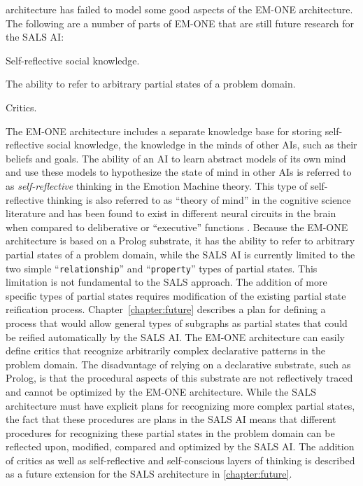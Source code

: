 architecture has failed to model some good aspects of the EM-ONE
architecture.  The following are a number of parts of EM-ONE that are
still future research for the SALS AI:
\begin{packed_enumerate}
\item{Self-reflective social knowledge.}
\item{The ability to refer to arbitrary partial states of a problem
  domain.}
\item{Critics.}
\end{packed_enumerate}
The EM-ONE architecture includes a separate knowledge base for storing
self-reflective social knowledge, the knowledge in the minds of other
AIs, such as their beliefs and goals.  The ability of an AI to learn
abstract models of its own mind and use these models to hypothesize
the state of mind in other AIs is referred to as
{\emph{self-reflective}} thinking in the Emotion Machine theory.  This
type of self-reflective thinking is also referred to as ``theory of
mind'' in the cognitive science literature and has been found to exist
in different neural circuits in the brain when compared to
deliberative or ``executive'' functions \cite[]{saxe:2006}.  Because
the EM-ONE architecture is based on a Prolog substrate, it has the
ability to refer to arbitrary partial states of a problem domain,
while the SALS AI is currently limited to the two simple
``{\tt{relationship}}'' and ``{\tt{property}}'' types of partial
states.  This limitation is not fundamental to the SALS approach.  The
addition of more specific types of partial states requires
modification of the existing partial state reification process.
{\mbox{Chapter~\ref{chapter:future}}} describes a plan for defining a
process that would allow general types of subgraphs as partial states
that could be reified automatically by the SALS AI.  The EM-ONE
architecture can easily define critics that recognize arbitrarily
complex declarative patterns in the problem domain.  The disadvantage
of relying on a declarative substrate, such as Prolog, is that the
procedural aspects of this substrate are not reflectively traced and
cannot be optimized by the EM-ONE architecture.  While the SALS
architecture must have explicit plans for recognizing more complex
partial states, the fact that these procedures are plans in the SALS
AI means that different procedures for recognizing these partial
states in the problem domain can be reflected upon, modified, compared
and optimized by the SALS AI.  The addition of critics as well as
self-reflective and self-conscious layers of thinking is described as
a future extension for the SALS architecture in
{\mbox{\autoref{chapter:future}}}.


